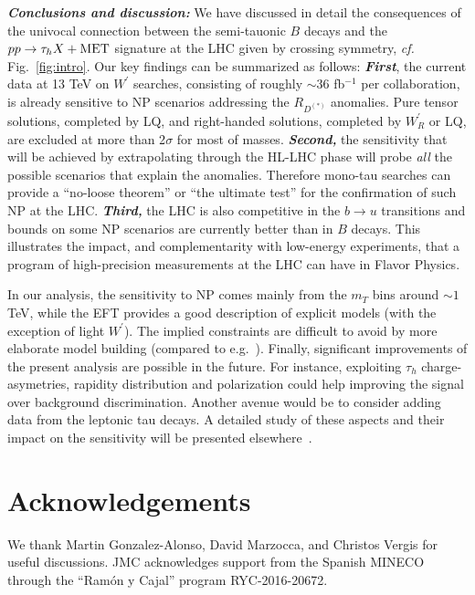 \documentclass[%
 reprint,
 superscriptaddress,preprintnumbers,
 amsmath,amssymb,
 aps,
]{revtex4-1}
\begin{document}
% 

\textit{\textbf{Conclusions and discussion:}} We have discussed in detail the consequences of the univocal connection between the semi-tauonic $B$ decays and the $pp\to\tau_h X+{\rm MET}$ signature at the LHC given by crossing symmetry, \textit{cf.} Fig.~\ref{fig:intro}. Our key findings can be summarized as follows: \textit{\textbf{First}}, the current data at 13 TeV on $W^\prime$ searches, consisting of roughly $\sim36$ fb$^{-1}$ per collaboration, is already sensitive to NP scenarios addressing the $R_{D^{(*)}}$ anomalies. Pure tensor solutions, completed by LQ, and right-handed solutions, completed by $W^\prime_R$ or LQ, are excluded at more than 2$\sigma$ for most of masses. \textit{\textbf{Second,}} the sensitivity that will be achieved by extrapolating through the HL-LHC phase will probe \textit{all} the possible scenarios that explain the anomalies. Therefore mono-tau searches can provide a ``no-loose theorem'' or ``the ultimate test'' for the confirmation of such NP at the LHC. \textit{\textbf{Third,}} the LHC is also competitive in the $b\to u$ transitions and bounds on some NP scenarios are currently better than in $B$ decays. This illustrates the impact, and complementarity with low-energy experiments, that a program of high-precision measurements at the LHC can have in Flavor Physics. 

{In our analysis, the sensitivity to NP comes mainly from the $m_T$ bins around $\sim 1$ TeV, while the EFT provides a {good} description of explicit models (with the exception of light $W^\prime$). The implied constraints are difficult to avoid by more elaborate model building (compared to e.g.~\cite{Faroughy:2016osc}).  Finally, significant improvements of the present analysis are possible in the future. For instance, exploiting $\tau_h$ charge-asymetries, rapidity distribution and polarization could help improving the signal over background discrimination. %
 Another avenue would be to consider adding data from the leptonic tau decays. A detailed study of these aspects and their impact on the sensitivity will be presented elsewhere~\cite{JAJfuture}. }



\section*{Acknowledgements}
 
We thank Martin Gonzalez-Alonso, David Marzocca, and Christos Vergis for useful discussions. JMC acknowledges support from the Spanish MINECO through the ``Ram\'on y Cajal'' program RYC-2016-20672.  






\end{document}

